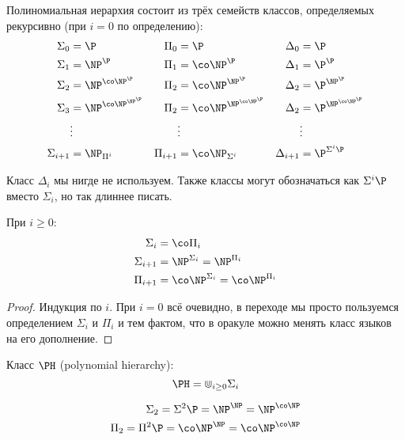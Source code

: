 	\begin{Def}
		Полиномиальная иерархия состоит из трёх семейств классов, определяемых рекурсивно (при $i=0$ по определению):
		\begin{align*}
			\Sigma_0 &= \P & \Pi_0 &= \P & \Delta_0 &= \P \\
			\Sigma_1 &= \NP^{\P} & \Pi_1 &= \co\NP^{\P} & \Delta_1 &= \P^{\P} \\
			\Sigma_2 &= \NP^{\co\NP^{\P}} & \Pi_2 &= \co\NP^{\NP^{\P}} & \Delta_2 &= \P^{\NP^\P} \\
			\Sigma_3 &= \NP^{\co\NP^{\NP^{\P}}} & \Pi_2 &= \co\NP^{\NP^{\co\NP^{\P}}} & \Delta_2 &= \P^{\NP^{\co\NP^\P}} \\
			&\vdots && \vdots && \vdots \\
			\Sigma_{i+1} &= \NP_{\Pi^i} & \Pi_{i+1} &= \co\NP_{\Sigma^i} & \Delta_{i+1} &= \P^{\Sigma^i\P}
		\end{align*}
	\end{Def}
	\begin{Rem}
		Класс $\Delta_i$ мы нигде не используем.
		Также классы могут обозначаться как $\Sigma^i \P$ вместо $\Sigma_i$, но так длиннее писать.
	\end{Rem}
	\begin{assertion}
		При $i \ge 0$:
		\begin{align*}
			\Sigma_i &= \co\Pi_i \\
			\Sigma_{i+1} &= \NP^{\Sigma_i} = \NP^{\Pi_i} \\
			\Pi_{i+1} &= \co\NP^{\Sigma_i} = \co\NP^{\Pi_i} \\
		\end{align*}
	\end{assertion}
	\begin{proof}
		Индукция по $i$.
		При $i=0$ всё очевидно, в переходе мы просто пользуемся определением $\Sigma_i$ и $\Pi_i$ и тем фактом, что в оракуле можно менять класс языков на его дополнение.
	\end{proof}
	\begin{Def}
		Класс $\PH$ (polynomial hierarchy):
		\[ \PH = \Cup_{i \ge 0} \Sigma_i \]
	\end{Def}
	\begin{exmp}
		\begin{align*}
			\Sigma_2 = \Sigma^2 \P = \NP^{\NP} = \NP^{\co\NP} \\
			\Pi_2 = \Pi^2 \P = \co\NP^{\NP} = \co\NP^{\co\NP}
		\end{align*}
	\end{exmp}

